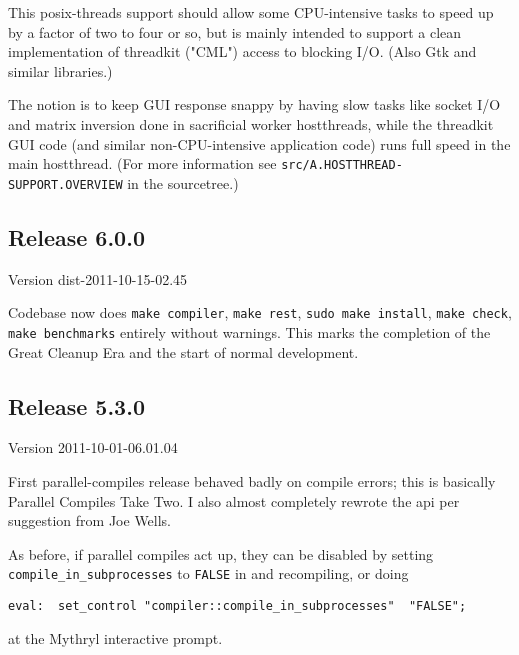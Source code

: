 This posix-threads support should allow some CPU-intensive tasks to speed up by 
a factor of two to four or so, but is mainly intended to support a clean implementation 
of threadkit ("CML") access to blocking I/O.  (Also Gtk and similar libraries.) 

The notion is to keep GUI response snappy by having slow tasks like 
socket I/O and matrix inversion done in sacrificial worker hostthreads, 
while the threadkit GUI code (and similar non-CPU-intensive 
application code) runs full speed in the main hostthread.  (For more 
information see {\tt src/A.HOSTTHREAD-SUPPORT.OVERVIEW} in the sourcetree.) 

\cutend*




\subsection{Release 6.0.0}
\label{section:src:release-6.0.0}

Version dist-2011-10-15-02.45 

Codebase now does {\tt make compiler}, {\tt make rest}, {\tt sudo make install}, {\tt make check}, {\tt make benchmarks} 
entirely without warnings.  This marks the completion of the Great Cleanup Era and the start of normal development. 

\cutend*



\subsection{Release 5.3.0}
\label{section:src:release-5.3.0}

Version 2011-10-01-06.01.04

First parallel-compiles release behaved badly on compile errors; 
this is basically Parallel Compiles Take Two.  I also almost 
completely rewrote the  
api per suggestion from Joe Wells. 

As before, if parallel compiles act up, they 
can be disabled by setting {\tt compile\_in\_subprocesses} to 
{\tt FALSE} in   
and recompiling, or doing 
\begin{verbatim}
eval:  set_control "compiler::compile_in_subprocesses" 	"FALSE";
\end{verbatim}
at the Mythryl interactive prompt. 

